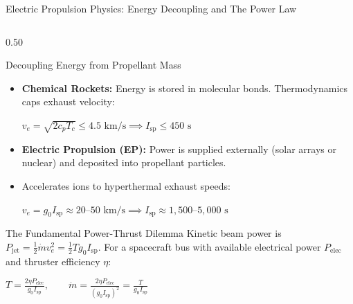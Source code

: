 \documentclass[aspectratio=169, 10pt]{beamer}
\begin{document}
\begin{frame}{Electric Propulsion Physics: Energy Decoupling and The Power Law}
    \begin{columns}[T]
        \begin{column}{0.50\textwidth}
            \begin{block}{Decoupling Energy from Propellant Mass}
                \scriptsize
                \begin{itemize}\setlength{\itemsep}{1.5pt}\setlength{\topsep}{0pt}
                    \item \textbf{Chemical Rockets:} Energy is stored in molecular bonds. Thermodynamics caps exhaust velocity:
                    \par\vspace{1pt}
                    {\centering $v_e = \sqrt{2 c_p T_c} \le 4.5\text{ km/s} \implies I_{\text{sp}} \le 450\text{ s}$ \par}
                    \item \textbf{Electric Propulsion (EP):} Power is supplied externally (solar arrays or nuclear) and deposited into propellant particles.
                    \item Accelerates ions to hyperthermal exhaust speeds:
                    \par\vspace{1pt}
                    {\centering $v_e = g_0 I_{\text{sp}} \approx 20\text{--}50\text{ km/s} \implies I_{\text{sp}} \approx 1{,}500\text{--}5{,}000\text{ s}$ \par}
                \end{itemize}
            \end{block}
            \vspace{-0.15cm}
            \begin{alertblock}{The Fundamental Power-Thrust Dilemma}
                \scriptsize
                Kinetic beam power is $P_{\text{jet}} = \frac{1}{2} \dot{m} v_e^2 = \frac{1}{2} T g_0 I_{\text{sp}}$. For a spacecraft bus with available electrical power $P_{\text{elec}}$ and thruster efficiency $\eta$:
                \par\vspace{1pt}
                {\centering $\displaystyle T = \frac{2 \eta P_{\text{elec}}}{g_0 I_{\text{sp}}}, \qquad \dot{m} = \frac{2 \eta P_{\text{elec}}}{(g_0 I_{\text{sp}})^2} = \frac{T}{g_0 I_{\text{sp}}}$ \par}
            \end{alertblock}
        \end{column}


\end{columns}
\end{frame}
\end{document}
